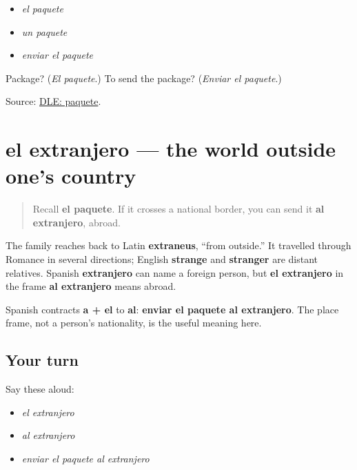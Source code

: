 \begin{itemize}
\raggedright
  \item \emph{el paquete}
  \item \emph{un paquete}
  \item \emph{enviar el paquete}
\end{itemize}

\begin{tcolorbox}[breakable,colback=teal!4,colframe=teal!35!black,title={Before you move on}]
Package? (\emph{El paquete}.) To send the package? (\emph{Enviar el paquete}.)

Source: \href{https://dle.rae.es/paquete}{DLE: paquete}.
\end{tcolorbox}
\section[el extranjero]{el extranjero — the world outside one's country}

\label{lesson:ES-C415-extranjero}



\begin{quote}
Recall \textbf{el paquete}. If it crosses a national border, you can send it \textbf{al extranjero}, abroad.
\end{quote}

\begin{cousinweb}
The family reaches back to Latin \textbf{extraneus}, “from outside.” It travelled through Romance in several directions; English \textbf{strange} and \textbf{stranger} are distant relatives. Spanish \textbf{extranjero} can name a foreign person, but \textbf{el extranjero} in the frame \textbf{al extranjero} means abroad.
\end{cousinweb}

\begin{grammarlens}[title={Grammar Lens: a + el}]
Spanish contracts \textbf{a + el} to \textbf{al}: \textbf{enviar el paquete al extranjero}. The place frame, not a person's nationality, is the useful meaning here.
\end{grammarlens}

\subsection*{Your turn}
Say these aloud:

\begin{itemize}
\raggedright
  \item \emph{el extranjero}
  \item \emph{al extranjero}
  \item \emph{enviar el paquete al extranjero}
\end{itemize}

